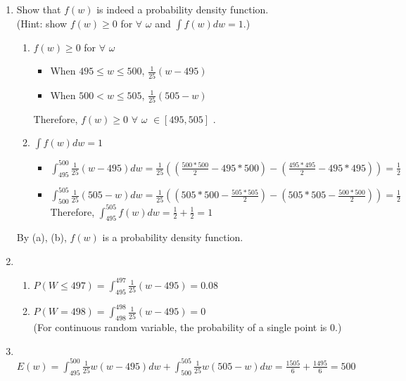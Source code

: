 \documentclass[12pt]{article}%
\begin{document}
\begin{enumerate}
    \doublespacing
    \item Show that $f(w)$ is indeed a probability density function.\\
    (Hint: show $f(w) \geq 0$ for $\forall$ $\omega$ and $\int\limits f(w)dw = 1$.)
    \color{blue}
    \begin{enumerate}
        \item $f(w) \geq 0$ for $\forall$ $\omega$
        \begin{itemize}
            \item When $495 \leq w \leq 500$, $\frac{1}{25} (w-495)$
            \item When $500 < w \leq 505$, $\frac{1}{25} (505-w)$
        \end{itemize}
        Therefore, $f(w) \geq 0$ $\forall$ $\omega$ $\in [495, 505]$ .
        \item $\int\limits f(w)dw = 1$
        \begin{itemize}
            \item $\int_{495}^{500} \frac{1}{25}(w-495)dw = \frac{1}{25}((\frac{500*500}{2}-495*500)-(\frac{495*495}{2}-495*495)) = \frac{1}{2}$
            \item $\int_{500}^{505} \frac{1}{25}(505-w)dw = \frac{1}{25}((505*500-\frac{505*505}{2})-(505*505-\frac{500*500}{2})) = \frac{1}{2}$
        Therefore, $\int_{495}^{505} f(w)dw=\frac{1}{2}+\frac{1}{2}=1$
        \end{itemize}
    \end{enumerate}
    By (a), (b), $f(w)$ is a probability density function.
    
    \item {}
    \begin{enumerate}
        \item $P(W \leq 497) = \int_{495}^{497} \frac{1}{25}(w-495) = 0.08$
        \item $P(W = 498) = \int_{498}^{498} \frac{1}{25}(w-495) = 0$\\
        (For continuous random variable, the probability of a single point is 0.)
    \end{enumerate}
    
    \pagebreak
    \item {}\\
    $E(w) = \int_{495}^{500} \frac{1}{25}w(w-495)dw + \int_{500}^{505} \frac{1}{25}w(505-w)dw = \frac{1505}{6} + \frac{1495}{6} = 500$
\end{enumerate}
\end{document}
